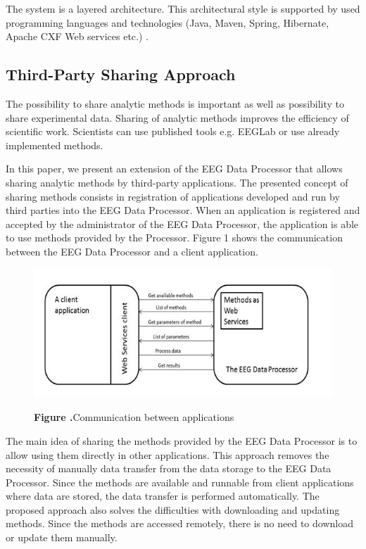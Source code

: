 \documentclass{frontiersSCNS} %
\begin{document}
The system is a layered architecture. This architectural style is supported by used programming languages and technologies (Java, Maven, Spring, Hibernate, Apache CXF Web services etc.) \cite{Jezek13}.

\subsection{Third-Party Sharing Approach}

The possibility to share analytic methods is important as well as possibility to share experimental data. Sharing of analytic methods improves the efficiency of scientific work. Scientists can use published tools e.g. EEGLab or use already implemented methods.

In this paper, we present an extension of the EEG Data Processor that allows sharing analytic methods by third-party applications.
The presented concept of sharing methods consists in registration of applications developed and run by third parties into the EEG Data Processor. When an application is registered and accepted by the administrator of the EEG Data Processor, the application is able to use methods provided by the Processor. Figure 1 shows the communication between the EEG Data Processor and a client application.

\begin{figure}
\begin{center}
\includegraphics[width=18cm]{methods}%
\end{center}
\textbf{\label{fig:01} Figure .}{Communication between applications }
\end{figure}

The main idea of sharing the methods provided by the EEG Data Processor is to allow using them directly in other applications. This approach removes the necessity of manually data transfer from the data storage to the EEG Data Processor. Since the methods are available and runnable from client applications where data are stored, the data transfer is performed automatically. The proposed approach also solves the difficulties with downloading and updating methods. Since the methods are accessed remotely, there is no need to download or update them manually.
\end{document}
